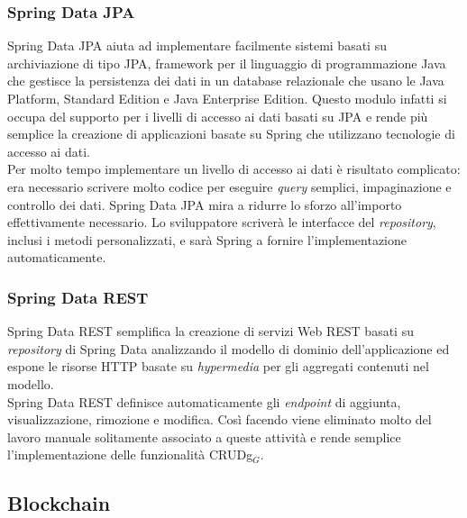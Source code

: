 \subsubsection{Spring Data JPA}
\label{subsubsec:spring-data-jpa}

Spring Data JPA aiuta ad implementare facilmente sistemi basati su archiviazione di tipo JPA, framework per il linguaggio di programmazione Java che gestisce la persistenza dei dati in un database relazionale che usano le Java Platform, Standard Edition e Java Enterprise Edition. Questo modulo infatti si occupa del supporto per i livelli di accesso ai dati basati su JPA e rende più semplice la creazione di applicazioni basate su Spring che utilizzano tecnologie di accesso ai dati.\\
Per molto tempo implementare un livello di accesso ai dati è risultato complicato: era necessario scrivere molto codice per eseguire \textit{query} semplici, impaginazione e controllo dei dati. Spring Data JPA mira a ridurre lo sforzo all'importo effettivamente necessario. Lo sviluppatore scriverà le interfacce del \textit{repository}, inclusi i metodi personalizzati, e sarà Spring a fornire l'implementazione automaticamente.

\subsubsection{Spring Data REST}
\label{subsubsec:spring-data-rest}

Spring Data REST semplifica la creazione di servizi Web REST basati su \textit{repository} di Spring Data analizzando il modello di dominio dell'applicazione ed espone le risorse HTTP basate su \textit{hypermedia} per gli aggregati contenuti nel modello.\\
Spring Data REST definisce automaticamente gli \textit{endpoint} di aggiunta, visualizzazione, rimozione e modifica. Così facendo viene eliminato molto del lavoro manuale solitamente associato a queste attività e rende semplice l'implementazione delle funzionalità \gls{CRUDg}$_G$.  

\subsection{Blockchain}
\label{subsec:blockchain}

